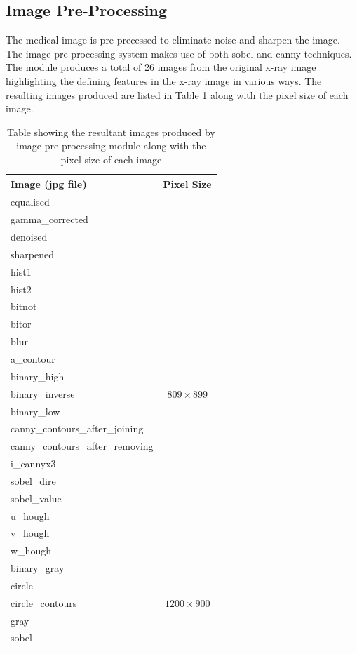 \documentclass[11pt,twocolumn]{witseiepaper}
\begin{document}
	\subsection{Image Pre-Processing}
	The medical image is pre-precessed to eliminate noise and sharpen the image. The image pre-processing system makes use of both sobel and canny techniques. The module produces a total of 26 images from the original x-ray image highlighting the defining features in the x-ray image in various ways. The resulting images produced are listed in Table \ref{tb: image table} along with the pixel size of each image.
	\vspace{-3mm}
	\begin{table}[!h]
		\centering
		\caption{Table showing the resultant images produced by image pre-processing module along with the pixel size of each image}
		\label{tb: image table}
		\begin{tabular}{| p{5.5cm} | c |}
			\hline
			Image (jpg file) & Pixel Size \\
			\hline \hline
			equalised &  \\
			gamma\_corrected &  \\
			denoised & \\
			sharpened & \\
			hist1 & \\
			hist2 & \\
			bitnot & \\
			bitor & \\
			blur & \\
			a\_contour & \\
			binary\_high & \\
			binary\_inverse & $809 \times 899$ \\
			binary\_low & \\
			canny\_contours\_after\_joining & \\
			canny\_contours\_after\_removing & \\
			i\_cannyx3 & \\
			sobel\_dire & \\
			sobel\_value & \\
			u\_hough & \\
			v\_hough & \\
			w\_hough & \\
			\hline
			binary\_gray & \\
			circle & \\
			circle\_contours & $1200 \times 900$ \\
			gray & \\
			sobel & \\
			\hline
		\end{tabular}
	\end{table}
\end{document}
